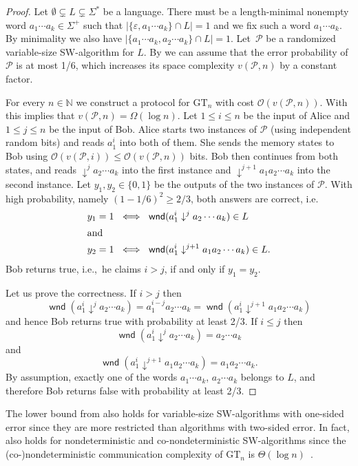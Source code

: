 \documentclass{theoretics}
\newcommand{\N}{\mathbb{N}}
\renewcommand{\O}{\mathcal{O}}
\renewcommand{\P}{\mathcal{P}}
\DeclareMathOperator{\wnd}{\mathsf{wnd}}
\newcommand{\eps}{\varepsilon}
\renewcommand{\geq}{\geqslant}
\renewcommand{\leq}{\leqslant}
\renewcommand{\ge}{\geq}
\renewcommand{\le}{\leq}
\begin{document}
\begin{proof}
	Let $\emptyset \subsetneq L \subsetneq \Sigma^*$ be a language.
	There must be a length-minimal nonempty word
	$a_1 \cdots a_k \in \Sigma^+$ such that $|\{\eps,a_1 \cdots a_k\} \cap L| = 1$ and we fix such a word
	$a_1 \cdots a_k$.
	By minimality we also have $|\{a_1 \cdots a_k,a_2 \cdots a_k\} \cap L| = 1$.
	Let~$\P$ be a randomized variable-size SW-algorithm for $L$.
	By  we can assume that the error probability of $\P$ is at most 1/6,
	which increases its space complexity $v(\P,n)$ by a constant factor.
	
	For every $n \in \N$ we construct a protocol for $\mathrm{GT}_n$
	with cost $\O(v(\P,n))$. With  this implies that $v(\P,n) = \Omega(\log n)$.
	Let $1 \le i \le n$ be the input of Alice and $1 \le j \le n$ be the input of Bob.
	Alice starts two instances of $\P$ (using independent random bits)
	and reads $a_1^i$ into both of them.
	She sends the memory states to Bob
	using $\O(v(\P,i)) \le \O(v(\P,n))$ bits.
	Bob then continues from both states, and reads $\downarrow^j a_2 \cdots a_k$ into the first instance
	and $\downarrow^{j+1} a_1 a_2 \cdots a_k$ into the second instance.
	Let $y_1, y_2 \in \{0,1\}$ be the outputs of the two instances of $\P$.
	With high probability, namely $(1-1/6)^2 \ge 2/3$,
	both answers are correct, i.e.
	\begin{align*}
		y_1 = 1 \ & \iff  \ \wnd(a_1^i \downarrow^j a_2 \cdots a_k) \in L \\
	\intertext{and}
		y_2 = 1 \ & \iff \  \wnd(a_1^i \downarrow^{j+1} a_1 a_2 \cdots a_k) \in L.
	\end{align*}
	Bob returns true, i.e.,~he claims $i > j$, if and only if $y_1 = y_2$.
	
	Let us prove the correctness. If $i > j$ then
	\[
		\wnd(a_1^i \downarrow^j a_2 \cdots a_k) = a_1^{i-j} a_2 \cdots a_k = \wnd(a_1^i \downarrow^{j+1} a_1 a_2 \cdots a_k)
	\]
	and hence Bob returns true with probability at least 2/3.
	If $i \le j$ then
	\[
		\wnd(a_1^i \downarrow^j a_2 \cdots a_k) = a_2 \cdots a_k
	\]
	and
	\[
		\wnd(a_1^i \downarrow^{j+1} a_1 a_2 \cdots a_k) = a_1a_2 \cdots a_k.
	\]
	By assumption, exactly one of the words $a_1 \cdots a_k$, $a_2 \cdots a_k$ belongs to $L$,
	and therefore Bob returns false with probability at least 2/3.
\end{proof}

The lower bound from  also holds for variable-size SW-algorithms with one-sided error
since they are more restricted than algorithms with two-sided error.
In fact,  also holds for nondeterministic and co-nondeterministic SW-algorithms
since the (co-)nondeterministic communication complexity of $\mathrm{GT}_n$ is $\Theta(\log n)$~\cite[Chapter~5]{Roughgarden16}.
\end{document}
